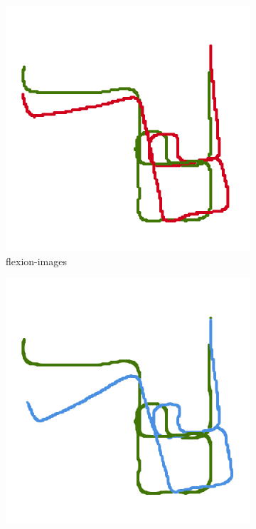 \begin{figure}[b!]
\begin{subfigure}[t]{0.31\linewidth}
    \includegraphics[width=\linewidth]{chapter06/odo/jonas_flexion_AKAZE_nice.png}%
    \caption{\glspl{flexion-image}}
\end{subfigure}%
\begin{subfigure}[t]{0.31\linewidth}
    \includegraphics[width=\linewidth]{chapter06/odo/jonas_bearing_AKAZE_nice.png}%

\end{subfigure}
\end{figure}
